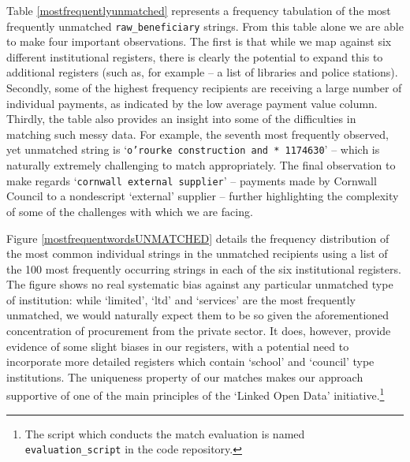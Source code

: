 \documentclass[11pt]{article}
\begin{document}
Table \ref{mostfrequentlyunmatched} represents a frequency tabulation of the most frequently unmatched \texttt{raw\_beneficiary} strings. From this table alone we are able to make four important observations. The first is that while we map against six different institutional registers, there is clearly the potential to expand this to additional registers (such as, for example -- a list of libraries and police stations). Secondly, some of the highest frequency recipients are receiving a large number of individual  payments, as indicated by the low average payment value column. Thirdly, the table also provides an insight into some of the difficulties in matching such messy data. For example, the seventh most frequently observed, yet unmatched string is `\texttt{o'rourke construction and * 1174630}' -- which is naturally extremely challenging to match appropriately. The final observation to make regards `\texttt{cornwall external supplier}' -- payments made by Cornwall Council to a nondescript `external' supplier -- further highlighting the complexity of some of the challenges with which we are facing.

Figure \ref{mostfrequentwordsUNMATCHED} details the frequency distribution of the most common individual strings in the unmatched recipients using a list of the 100 most frequently occurring strings in each of the six institutional registers. The figure shows no real systematic bias against any particular unmatched type of institution: while `limited', `ltd' and `services' are the most frequently unmatched, we would naturally expect them to be so given the aforementioned concentration of procurement from the private sector. It does, however, provide evidence of some slight biases in our registers, with a potential need to incorporate more detailed registers which contain `school' and `council' type institutions. The uniqueness property of our matches makes our approach supportive of one of the main principles of the `Linked Open Data' initiative.\footnote{The script which conducts the match evaluation is named \texttt{evaluation\_script} in the code repository.}
\end{document}
